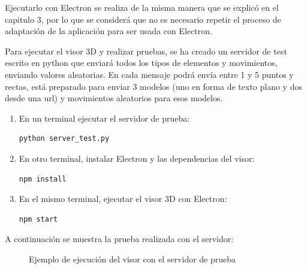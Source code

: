 Ejecutarlo con Electron se realiza de la misma manera que se explicó en el capitulo 3, por lo que se considerá que no es necesario repetir el proceso de adaptación de la aplicación para ser usada con Electron.

Para ejecutar el visor 3D y realizar pruebas, se ha creado un servidor de test escrito en python que enviará todos los tipos de elementos y movimientos, enviando valores aleatorias. En cada mensaje podrá envía entre 1 y 5 puntos y rectas, está preparado para enviar 3 modelos (uno en forma de texto plano y dos desde una url) y movimientos aleatorios para esos modelos.

\begin{enumerate}
\item En un terminal ejecutar el servidor de prueba:
\begin{lstlisting}[frame=single]
python server_test.py
\end{lstlisting}
\item En otro terminal, instalar Electron y las dependencias del visor:
\begin{lstlisting}[frame=single]
npm install
\end{lstlisting}
\item En el mismo terminal, ejecutar el visor 3D con Electron:
\begin{lstlisting}[frame=single]
npm start
\end{lstlisting}
\end{enumerate}

A continuación se muestra la prueba realizada con el servidor:

\begin{figure}[H]
  \begin{center}
    \caption{Ejemplo de ejecución del visor con el servidor de prueba}
     \label{fig.ejemplo3dviz}
     \end{center}
\end{figure}












